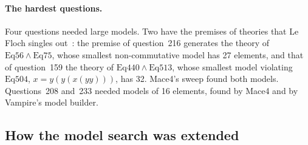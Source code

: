 \documentclass[11pt,a4paper]{article}
\theoremstyle{definition}
\theoremstyle{remark}
\newcommand{\Eq}[1]{\mathrm{Eq}#1}
\begin{document}
\paragraph{The hardest questions.} Four questions needed large models. Two have the premises of theories that Le Floch singles out~\cite[Section~4]{LF26b}: the premise of question~216 generates the theory of $\Eq{56} \wedge \Eq{75}$, whose smallest non-commutative model has 27 elements, and that of question~159 the theory of $\Eq{440} \wedge \Eq{513}$, whose smallest model violating $\Eq{504}$, $x = y(y(x(yy)))$, has 32. Mace4's sweep found both models. Questions~208 and~233 needed models of 16 elements, found by Mace4 and by Vampire's model builder.

\subsection{How the model search was extended}
\end{document}
